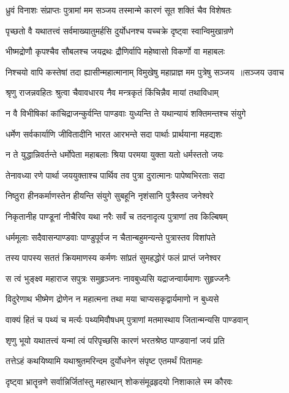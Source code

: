 \twolineshloka
{ध्रुवं विनाशः संप्राप्तः पुत्रामां मम सञ्जय}
{तस्मान्मे कारणं सूत शक्तिं चैव विशेषतः}


\twolineshloka
{पृच्छतो वै यथातत्त्वं सर्वमाख्यातुमर्हसि}
{दुर्योधनश्च यच्चक्रे दृष्ट्वा स्वान्विमुखान्रणे}


\twolineshloka
{भीष्मद्रोणौ कृपश्चैव सौबलश्च जयद्रथः}
{द्रौणिर्वापि महेष्वासो विकर्णो वा महाबलः}


\threelineshloka
{निश्चयो वापि कस्तेषां तदा ह्यासीन्महात्मानाम्}
{विमुखेषु महाप्राज्ञ मम पुत्रेषु सञ्जय ॥सञ्जय उवाच}
{}


\twolineshloka
{श्रृणु राजन्नवहितः श्रुत्वा चैवावधारय}
{नैव मन्त्रकृतं किंचिन्नैव मायां तथाविधाम्}


\twolineshloka
{न वै विभीषिकां कांचिद्राजन्कुर्वन्ति पाण्डवाः}
{युध्यन्ति ते यथान्यायं शक्तिमन्तश्च संयुगे}


\twolineshloka
{धर्मेण सर्वकार्याणि जीवितादीनि भारत}
{आरभन्ते सदा पार्थाः प्रार्थयाना महद्यशः}


\twolineshloka
{न ते युद्धान्निवर्तन्ते धर्मोपेता महाबलाः}
{श्रिया परमया युक्ता यतो धर्मस्ततो जयः}


\twolineshloka
{तेनावध्या रणे पार्था जययुक्ताश्च पार्थिव}
{तव पुत्रा दुरात्मानः पापेष्वभिरताः सदा}


\twolineshloka
{निष्ठुरा हीनकर्माणस्तेन हीयन्ति संयुगे}
{सुबहूनि नृशंसानि पुत्रैस्तव जनेश्वरे}


\twolineshloka
{निकृतानीह पाण्डूनां नीचैरिव यथा नरैः}
{सर्वं च तदनादृत्य पुत्राणां तव किल्बिषम्}


\threelineshloka
{धर्ममूलाः सदैवासन्पाण्डवाः पाण्डुपूर्वज}
{न चैतान्बहुमन्यन्ते पुत्रास्तव विशांपते}
{}


\twolineshloka
{तस्य पापस्य सततं क्रियमाणस्य कर्मणः}
{सांप्रतं सुमहद्धोरं फलं प्राप्तं जनेश्वर}


\twolineshloka
{स त्वं भुङ्क्ष्व महाराज सपुत्रः समुहृञ्जनः}
{नावबुध्यसि यद्राजन्वार्यमाणः सुहृज्जनैः}


\twolineshloka
{विदुरेणाथ भीष्मेण द्रोणेन न महात्मना}
{तथा मया चाप्यसकृद्वार्यमाणो न बुध्यसे}


\twolineshloka
{वाक्यं हितं च पथ्यं च मर्त्यः पथ्यमिवौषधम्}
{पुत्राणां मतमास्थाय जितान्मन्यसि पाण्डवान्}


\twolineshloka
{शृणु भूयो यथातत्त्वं यन्मां त्वं परिपृच्छसि}
{कारणं भरतश्रेष्ठ पाण्डवानां जयं प्रति}


\twolineshloka
{तत्तेऽहं कथयिष्यामि यथाश्रुतमरिन्दम}
{दुर्योधनेन संपृष्ट एतमर्थं पितामहः}


\twolineshloka
{दृष्ट्वा भ्रातॄन्रणे सर्वान्निर्जितांस्तु महारथान्}
{शोकसंमूढहृदयो निशाकाले स्म कौरवः}


